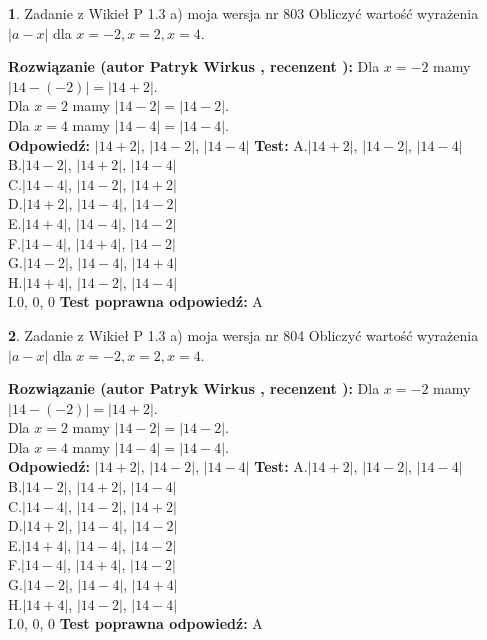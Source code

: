 \documentclass[12pt, a4paper]{article}
\theoremstyle{definition} %
\newtheorem{zad}{}
\newcommand{\zadStart}[1]{\begin{zad}#1\newline}
\newcommand{\zadStop}{\end{zad}}
\newcommand{\rozwStart}[2]{\noindent \textbf{Rozwiązanie (autor #1 , recenzent #2): }\newline}
\newcommand{\rozwStop}{\newline}
\newcommand{\odpStart}{\noindent \textbf{Odpowiedź:}\newline}
\newcommand{\odpStop}{\newline}
\newcommand{\testStart}{\noindent \textbf{Test:}\newline}
\newcommand{\testStop}{\newline}
\newcommand{\kluczStart}{\noindent \textbf{Test poprawna odpowiedź:}\newline}
\newcommand{\kluczStop}{\newline}
\begin{document}
\zadStart{Zadanie z Wikieł P 1.3 a) moja wersja nr 803}
Obliczyć wartość wyrażenia $|a - x|$ dla $x=-2,x=2,x=4$.
\zadStop
\rozwStart{Patryk Wirkus}{}
Dla $x = -2$ mamy $|14 - (-2)| = |14 + 2|$.\\
Dla $x = 2$ mamy $|14 - 2| = |14 - 2|$.\\
Dla $x = 4$ mamy $|14 - 4| = |14 - 4|$.\\
\rozwStop
\odpStart
$|14 + 2|$, $|14 - 2|$, $|14 - 4|$
\odpStop
\testStart
A.$|14 + 2|$, $|14 - 2|$, $|14 - 4|$\\
B.$|14 - 2|$, $|14 + 2|$, $|14 - 4|$\\
C.$|14 - 4|$, $|14 - 2|$, $|14 + 2|$\\
D.$|14 + 2|$, $|14 - 4|$, $|14 - 2|$\\
E.$|14 + 4|$, $|14 - 4|$, $|14 - 2|$\\
F.$|14 - 4|$, $|14 + 4|$, $|14 - 2|$\\
G.$|14 - 2|$, $|14 - 4|$, $|14 + 4|$\\
H.$|14 + 4|$, $|14 - 2|$, $|14 - 4|$\\
I.$0$, $0$, $0$
\testStop
\kluczStart
A
\kluczStop



\zadStart{Zadanie z Wikieł P 1.3 a) moja wersja nr 804}
Obliczyć wartość wyrażenia $|a - x|$ dla $x=-2,x=2,x=4$.
\zadStop
\rozwStart{Patryk Wirkus}{}
Dla $x = -2$ mamy $|14 - (-2)| = |14 + 2|$.\\
Dla $x = 2$ mamy $|14 - 2| = |14 - 2|$.\\
Dla $x = 4$ mamy $|14 - 4| = |14 - 4|$.\\
\rozwStop
\odpStart
$|14 + 2|$, $|14 - 2|$, $|14 - 4|$
\odpStop
\testStart
A.$|14 + 2|$, $|14 - 2|$, $|14 - 4|$\\
B.$|14 - 2|$, $|14 + 2|$, $|14 - 4|$\\
C.$|14 - 4|$, $|14 - 2|$, $|14 + 2|$\\
D.$|14 + 2|$, $|14 - 4|$, $|14 - 2|$\\
E.$|14 + 4|$, $|14 - 4|$, $|14 - 2|$\\
F.$|14 - 4|$, $|14 + 4|$, $|14 - 2|$\\
G.$|14 - 2|$, $|14 - 4|$, $|14 + 4|$\\
H.$|14 + 4|$, $|14 - 2|$, $|14 - 4|$\\
I.$0$, $0$, $0$
\testStop
\kluczStart
A
\kluczStop
\end{document}
